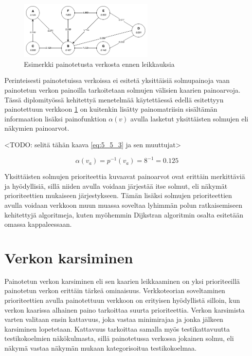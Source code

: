   \begin{figure}[H]
    \centering
    \includegraphics[width=0.6\textwidth]{assets/painotettu-verkko-ennen.png}
    \caption{Esimerkki painotetusta verkosta ennen leikkauksia}
    \label{fig:painotettu-verkko-ennen}
  \end{figure}

  Perinteisesti painotetuissa verkoissa ei esitetä yksittäisiä solmupainoja vaan painotetun verkon painoilla tarkoitetaan solmujen välisien kaarien painoarvoja.
  Tässä diplomityössä kehitettyä menetelmää käytettäessä edellä esitettyyn painotettuun verkkoon \ref{fig:painotettu-verkko-ennen} on kuitenkin lisätty painomatriisin sisältämän informaation lisäksi painofunktion \(\alpha(v)\) avulla lasketut yksittäisten solmujen eli näkymien painoarvot.

  <TODO: selitä tähän kaava \ref{eq:5_5_3} ja sen muuttujat>

  \begin{equation} \label{eq:5_5_3}
    \alpha(v_a) = p^{-1}(v_a) = 8^{-1}  = 0.125
  \end{equation}

  Yksittäisten solmujen prioriteettia kuvaavat painoarvot ovat erittäin merkittäviä ja hyödyllisiä, sillä niiden avulla voidaan järjestää itse solmut, eli näkymät prioriteettien mukaiseen järjestykseen.
  Tämän lisäksi solmujen prioriteettien avulla voidaan verkkoon muun muassa soveltaa lyhimmän polun ratkaisemiseen kehitettyjä algoritmeja, kuten myöhemmin Dijkstran algoritmin osalta esitetään omassa kappaleessaan.

\section{Verkon karsiminen} \label{ch:10_verkon_karsiminen}

  Painotetun verkon karsiminen eli sen kaarien leikkaaminen on yksi prioriteeillä painotetun verkon erittäin tärkeä ominaisuus.
  Verkkoteorian soveltaminen prioriteettien avulla painotettuun verkkoon on erityisen hyödyllistä silloin, kun verkon kaarissa alhainen paino tarkoittaa suurta prioriteettia.
  Verkon karsimista varten valitaan ensin kattavuus, joka vastaa minimirajaa ja jonka jälkeen karsiminen lopetetaan.
  Kattavuus tarkoittaa samalla myös testikattavuutta testikokoelmien näkökulmasta, sillä painotetussa verkossa jokainen solmu, eli näkymä vastaa näkymän mukaan kategorisoitua testikokoelmaa.

